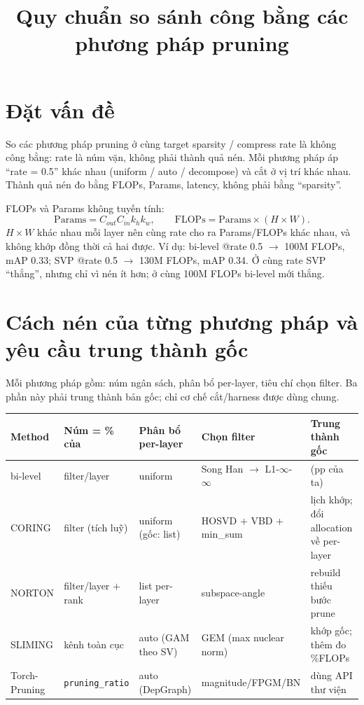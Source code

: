 \documentclass[11pt,a4paper]{article}
\title{Quy chuẩn so sánh công bằng các phương pháp pruning}
\author{}
\date{}
\newcommand{\code}[1]{\texttt{#1}}
\begin{document}
\maketitle
\vspace{-2.5em}

\section{Đặt vấn đề}

So các phương pháp pruning ở cùng target sparsity / compress rate là không công bằng: rate là núm vặn,
không phải thành quả nén. Mỗi phương pháp áp ``rate = 0.5'' khác nhau (uniform / auto / decompose) và
cắt ở vị trí khác nhau. Thành quả nén đo bằng FLOPs, Params, latency, không phải bằng ``sparsity''.

FLOPs và Params không tuyến tính:
\[
  \text{Params} = C_{out}C_{in}k_h k_w, \qquad \text{FLOPs} = \text{Params}\times(H\times W).
\]
$H\times W$ khác nhau mỗi layer nên cùng rate cho ra Params/FLOPs khác nhau, và không khớp đồng thời cả
hai được. Ví dụ: bi-level @rate 0.5 $\to$ 100M FLOPs, mAP 0.33; SVP @rate 0.5 $\to$ 130M FLOPs, mAP
0.34. Ở cùng rate SVP ``thắng'', nhưng chỉ vì nén ít hơn; ở cùng 100M FLOPs bi-level mới thắng.

\section{Cách nén của từng phương pháp và yêu cầu trung thành gốc}

Mỗi phương pháp gồm: núm ngân sách, phân bổ per-layer, tiêu chí chọn filter. Ba phần này phải trung
thành bản gốc; chỉ cơ chế cắt/harness được dùng chung.

\footnotesize
\renewcommand{\arraystretch}{1.35}
\begin{tabularx}{\textwidth}{|p{2cm}|Y|Y|Y|p{2.4cm}|}
\hline
Method & Núm = \% của & Phân bổ per-layer & Chọn filter & Trung thành gốc\\
\hline
bi-level & filter/layer & uniform & Song Han $\to$ L1-$\infty$-$\infty$ & (pp của ta)\\
\hline
CORING & filter (tích luỹ) & uniform (gốc: list) & HOSVD $+$ VBD $+$ min\_sum & lịch khớp; đổi allocation về per-layer\\
\hline
NORTON & filter/layer $+$ rank & list per-layer & subspace-angle & rebuild thiếu bước prune\\
\hline
SLIMING & kênh toàn cục & auto (GAM theo SV) & GEM (max nuclear norm) & khớp gốc; thêm đo \%FLOPs\\
\hline
Torch-Pruning & \code{pruning\_ratio} & auto (DepGraph) & magnitude/FPGM/BN & dùng API thư viện\\
\hline
\end{tabularx}
\normalsize
\end{document}
